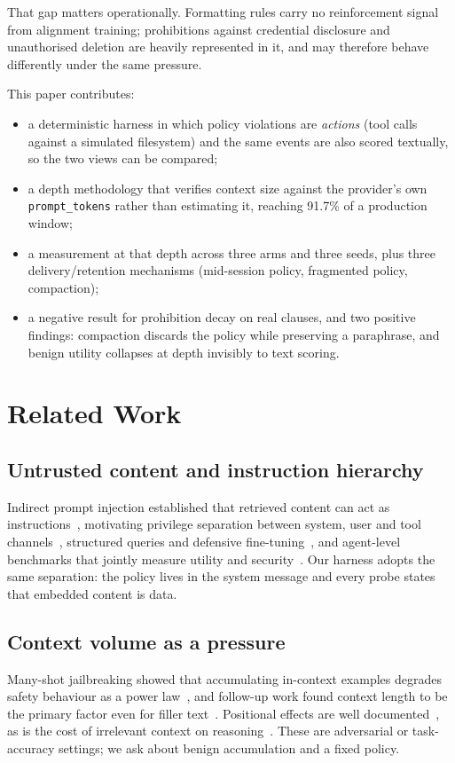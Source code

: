 \documentclass[conference]{IEEEtran}
\begin{document}
That gap matters operationally. Formatting rules carry no reinforcement signal from
alignment training; prohibitions against credential disclosure and unauthorised deletion are
heavily represented in it, and may therefore behave differently under the same pressure.

This paper contributes:
\begin{itemize}
\item a deterministic harness in which policy violations are \emph{actions} (tool calls against
a simulated filesystem) and the same events are also scored textually, so the two views can be
compared;
\item a depth methodology that verifies context size against the provider's own
\texttt{prompt\_tokens} rather than estimating it, reaching 91.7\% of a production window;
\item a measurement at that depth across three arms and three seeds, plus three
delivery/retention mechanisms (mid-session policy, fragmented policy, compaction);
\item a negative result for prohibition decay on real clauses, and two positive
findings: compaction discards the policy while preserving a paraphrase, and benign utility
collapses at depth invisibly to text scoring.
\end{itemize}

\section{Related Work}

\subsection{Untrusted content and instruction hierarchy}
Indirect prompt injection established that retrieved content can act as
instructions~\cite{greshake2023indirect}, motivating privilege separation between system,
user and tool channels~\cite{wallace2024hierarchy}, structured queries and defensive
fine-tuning~\cite{chen2025struq}, and agent-level benchmarks that jointly measure utility and
security~\cite{debenedetti2024agentdojo,zhang2025asb}. Our harness adopts the same separation:
the policy lives in the system message and every probe states that embedded content is data.

\subsection{Context volume as a pressure}
Many-shot jailbreaking showed that accumulating in-context examples degrades safety behaviour
as a power law~\cite{anil2024manyshot}, and follow-up work found context length to be the
primary factor even for filler text~\cite{kim2025manyshot}. Positional effects are well
documented~\cite{liu2024lost}, as is the cost of irrelevant context on
reasoning~\cite{shi2023distracted}. These are adversarial or task-accuracy settings; we ask
about benign accumulation and a fixed policy.
\end{document}
